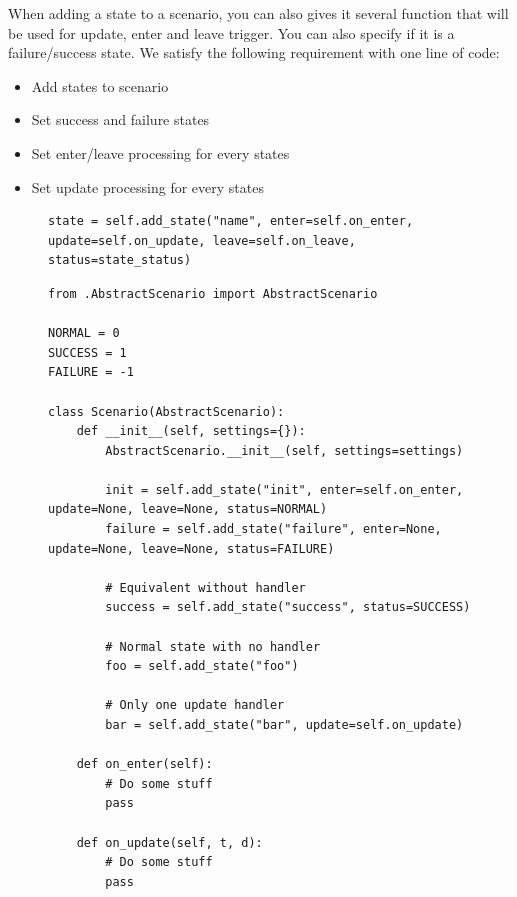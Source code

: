 \documentclass[12pt]{article}
\theoremstyle{definition}
\theoremstyle{definition}
\theoremstyle{remark}
\begin{document}
When adding a state to a scenario, you can also gives it several function that will be used for update, enter and leave trigger. You can also specify if it is a failure/success state. We satisfy the following requirement with one line of code:
\begin{itemize}
\item Add states to scenario
\item Set success and failure states
\item Set enter/leave processing for every states
\item Set update processing for every states
\end{itemize}


\begin{figure}[H]
    \begin{lstlisting}[caption="Add states",label={lst:python-add-state}]
state = self.add_state("name", enter=self.on_enter, update=self.on_update, leave=self.on_leave, status=state_status)
    \end{lstlisting}
\end{figure}


\begin{figure}[H]
    \begin{lstlisting}[caption="Various usage of self.add\_state",label={lst:python-add-state-examples}]
from .AbstractScenario import AbstractScenario

NORMAL = 0
SUCCESS = 1
FAILURE = -1

class Scenario(AbstractScenario):
    def __init__(self, settings={}):
        AbstractScenario.__init__(self, settings=settings)

        init = self.add_state("init", enter=self.on_enter, update=None, leave=None, status=NORMAL)
        failure = self.add_state("failure", enter=None, update=None, leave=None, status=FAILURE)

        # Equivalent without handler
        success = self.add_state("success", status=SUCCESS)

        # Normal state with no handler
        foo = self.add_state("foo")

        # Only one update handler
        bar = self.add_state("bar", update=self.on_update)

    def on_enter(self):
        # Do some stuff
        pass

    def on_update(self, t, d):
        # Do some stuff
        pass
    \end{lstlisting}
\end{figure}
\end{document}

